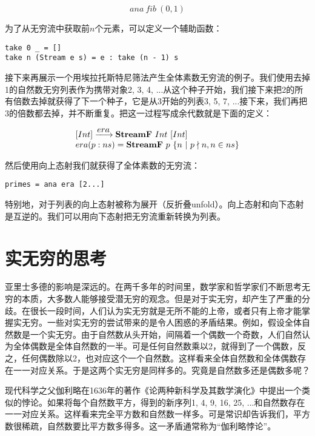 \documentclass{article}
\begin{document}
\[
ana\ fib\ (0, 1)
\]

为了从无穷流中获取前$n$个元素，可以定义一个辅助函数：

\begin{lstlisting}
take 0 _ = []
take n (Stream e s) = e : take (n - 1) s
\end{lstlisting}

接下来再展示一个用埃拉托斯特尼筛法产生全体素数无穷流的例子。我们使用去掉1的自然数无穷列表作为携带对象2, 3, 4, ...从这个种子开始，我们接下来把2的所有倍数去掉就获得了下一个种子，它是从3开始的列表3, 5, 7, ...接下来，我们再把3的倍数都去掉，并不断重复。把这一过程写成余代数就是下面的定义：

\[
\begin{array}{l}
[Int] \arrowto{era} \mathbf{StreamF}\ Int\ [Int] \\
era (p:ns) = \mathbf{StreamF}\ p\ \{ n\ |\ p \nmid n, n \in ns\} \\
\end{array}
\]

然后使用向上态射我们就获得了全体素数的无穷流：

\begin{lstlisting}
primes = ana era [2...]
\end{lstlisting}

特别地，对于列表的向上态射被称为展开（反折叠unfold）。向上态射和向下态射是互逆的。我们可以用向下态射把无穷流重新转换为列表。

\begin{Exercise}
\end{Exercise}

\section{实无穷的思考}
亚里士多德的影响是深远的。在两千多年的时间里，数学家和哲学家们不断思考无穷的本质，大多数人能够接受潜无穷的观念。但是对于实无穷，却产生了严重的分歧。在很长一段时间，人们认为实无穷就是无所不能的上帝，或者只有上帝才能掌握实无穷。一些对实无穷的尝试带来的是令人困惑的矛盾结果。例如，假设全体自然数是一个实无穷。由于自然数从头开始，间隔着一个偶数一个奇数，人们自然认为全体偶数是全体自然数的一半。可是任何自然数乘以2，就得到了一个偶数，反之，任何偶数除以2，也对应这个一个自然数。这样看来全体自然数和全体偶数存在一一对应关系。于是这两个实无穷是同样多的。究竟是自然数多还是偶数多呢？

现代科学之父伽利略在1636年的著作《论两种新科学及其数学演化》中提出一个类似的悖论。如果将每个自然数平方，得到的新序列1, 4, 9, 16, 25, ...和自然数存在一一对应关系。这样看来完全平方数和自然数一样多。可是常识却告诉我们，平方数很稀疏，自然数要比平方数多得多。这一矛盾通常称为“伽利略悖论”。
\end{document}
